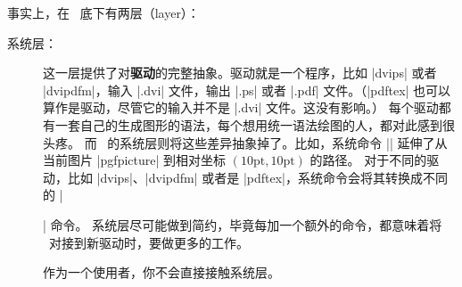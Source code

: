 \begin{onehalfspacing}

事实上，在 \tikzname\ 底下有两层（layer）：

\begin{description}
\item[系统层：] 这一层提供了对\textbf{驱动}的完整抽象。驱动就是一个程序，比如 |dvips| 或者 |dvipdfm|，输入 |.dvi| 文件，输出 |.ps| 或者 |.pdf| 文件。（|pdftex| 也可以算作是驱动，尽管它的输入并不是 |.dvi| 文件。这没有影响。）
每个驱动都有一套自己的生成图形的语法，每个想用统一语法绘图的人，都对此感到很头疼。
而 \pgfname\ 的系统层则将这些差异抽象掉了。比如，系统命令 |\pgfsys@lineto{10pt}{10pt}| 延伸了从当前图片 |{pgfpicture}| 到相对坐标 $(10\mathrm{pt},10\mathrm{pt})$ 的路径。
对于不同的驱动，比如 |dvips|、|dvipdfm| 或者是 |pdftex|，系统命令会将其转换成不同的 |\special| 命令。
系统层尽可能做到简约，毕竟每加一个额外的命令，都意味着将 \pgfname\ 对接到新驱动时，要做更多的工作。

作为一个使用者，你不会直接接触系统层。


\end{description}
\end{onehalfspacing}
